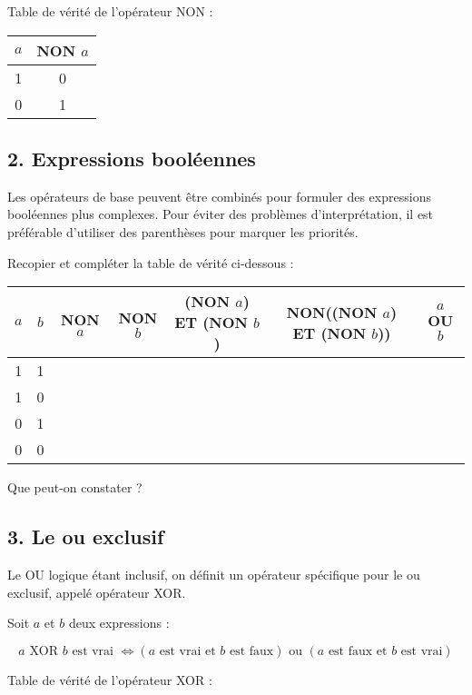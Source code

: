 \documentclass[11pt,a4paper]{article}
\newenvironment{definition}[1]{\begin{tcolorbox}[title= {\color{NavyBlue} \faPencil*}~~\textbf{Définition #1}, colframe=NavyBlue, colback=white, colbacktitle=NavyBlue!10!white, coltitle=black, boxrule=0.1mm, titlerule=0mm]}{\end{tcolorbox}}
\newenvironment{exercice}[1]{\begin{tcolorbox}[title= {\color{YellowGreen} \faQuestion}~~\textbf{Exercice #1}, colframe=YellowGreen, colback=white, colbacktitle=YellowGreen!15!white, coltitle=black, boxrule=0.1mm, titlerule=0mm]}{\end{tcolorbox}}
\begin{document}
Table de vérité de l'opérateur NON :

\begin{longtable}[]{@{}cc@{}}
\toprule
\(a\) & NON \(a\)\tabularnewline
\midrule
\endhead
1 & 0\tabularnewline
0 & 1\tabularnewline
\bottomrule
\end{longtable}

\hypertarget{expressions-booluxe9ennes}{%
\subsection*{2. Expressions booléennes}\label{expressions-booluxe9ennes}}

Les opérateurs de base peuvent être combinés pour formuler des
expressions booléennes plus complexes. Pour éviter des problèmes
d'interprétation, il est préférable d'utiliser des parenthèses pour
marquer les priorités.

\begin{exercice}{}
 
Recopier et compléter la table de vérité ci-dessous :

\begin{longtable}[]{@{}ccccccc@{}}
    \toprule
    \(a\) & \(b\) & NON \(a\) & NON \(b\) & (NON \(a\)) ET (NON \(b\)) &
    NON((NON \(a\)) ET (NON \(b\))) & \(a\) OU \(b\)\tabularnewline
    \midrule
    \endhead
    1 & 1 & & & & &\tabularnewline
    1 & 0 & & & & &\tabularnewline
    0 & 1 & & & & &\tabularnewline
    0 & 0 & & & & &\tabularnewline
    \bottomrule
    \end{longtable}

Que peut-on constater ?
\end{exercice}

\hypertarget{le-ou-exclusif}{%
\subsection*{3. Le ou exclusif}\label{le-ou-exclusif}}

Le OU logique étant inclusif, on définit un opérateur spécifique pour le
ou exclusif, appelé opérateur XOR.

\begin{definition}{} Soit \(a\) et \(b\) deux expressions :

 
$$a\textrm{ XOR }b\textrm{ est vrai }\iff (a\textrm{ est vrai et }b\textrm{ est faux})\textrm{ ou }(a\textrm{ est faux et }b\textrm{ est vrai})$$
\end{definition}

Table de vérité de l'opérateur XOR :
\end{document}
